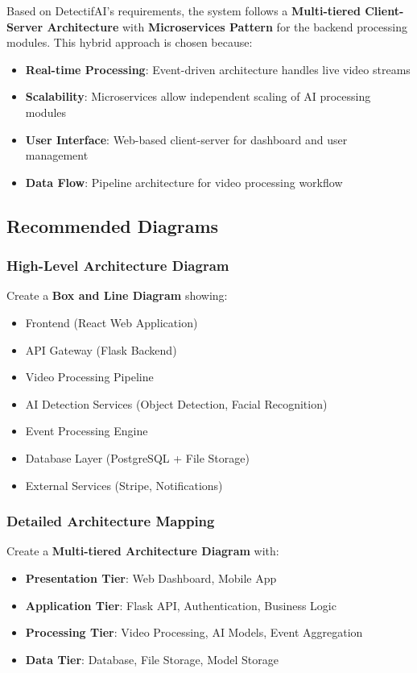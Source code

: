 \documentclass[12pt,a4paper]{article}
\begin{document}
Based on DetectifAI's requirements, the system follows a \textbf{Multi-tiered Client-Server Architecture} with \textbf{Microservices Pattern} for the backend processing modules. This hybrid approach is chosen because:

\begin{itemize}
    \item \textbf{Real-time Processing}: Event-driven architecture handles live video streams
    \item \textbf{Scalability}: Microservices allow independent scaling of AI processing modules
    \item \textbf{User Interface}: Web-based client-server for dashboard and user management
    \item \textbf{Data Flow}: Pipeline architecture for video processing workflow
\end{itemize}

\subsection{Recommended Diagrams}

\subsubsection{High-Level Architecture Diagram}
Create a \textbf{Box and Line Diagram} showing:
\begin{itemize}
    \item Frontend (React Web Application)
    \item API Gateway (Flask Backend)
    \item Video Processing Pipeline
    \item AI Detection Services (Object Detection, Facial Recognition)
    \item Event Processing Engine
    \item Database Layer (PostgreSQL + File Storage)
    \item External Services (Stripe, Notifications)
\end{itemize}

\subsubsection{Detailed Architecture Mapping}
Create a \textbf{Multi-tiered Architecture Diagram} with:
\begin{itemize}
    \item \textbf{Presentation Tier}: Web Dashboard, Mobile App
    \item \textbf{Application Tier}: Flask API, Authentication, Business Logic
    \item \textbf{Processing Tier}: Video Processing, AI Models, Event Aggregation
    \item \textbf{Data Tier}: Database, File Storage, Model Storage
\end{itemize}
\end{document}
